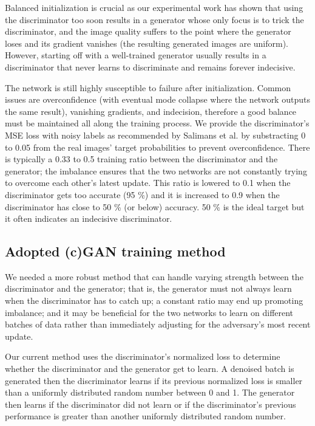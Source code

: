Balanced initialization is crucial as our experimental work has shown that using the discriminator too soon results in a generator whose only focus is to trick the discriminator, and the image quality suffers to the point where the generator loses and its gradient vanishes (the resulting generated images are uniform). However, starting off with a well-trained generator usually results in a discriminator that never learns to discriminate and remains forever indecisive.

The network is still highly susceptible to failure after initialization. Common issues are overconfidence (with eventual mode collapse where the network outputs the same result), vanishing gradients, and indecision, therefore a good balance must be maintained all along the training process. We provide the discriminator's \ac{MSE} loss with noisy labels as recommended by Salimans et al. \cite{gantechniques}\cite{gantutorial} by substracting 0 to 0.05 from the real images' target probabilities to prevent overconfidence. There is typically a 0.33 to 0.5 training ratio between the discriminator and the generator; the imbalance ensures that the two networks are not constantly trying to overcome each other's latest update. This ratio is lowered to 0.1 when the discriminator gets too accurate (95 \%) and it is increased to 0.9 when the discriminator has close to 50 \% (or below) accuracy. 50 \% is the ideal target but it often indicates an indecisive discriminator.

\subsection{Adopted (c)GAN training method}\label{sec:Adopted training method}

We needed a more robust method that can handle varying strength between the discriminator and the generator; that is, the generator must not always learn when the discriminator has to catch up; a constant ratio may end up promoting imbalance; and it may be beneficial for the two networks to learn on different batches of data rather than immediately adjusting for the adversary's most recent update.

Our current method uses the discriminator's normalized loss to determine whether the discriminator and the generator get to learn. A denoised batch is generated then the discriminator learns if its previous normalized loss is smaller than a uniformly distributed random number between 0 and 1. The generator then learns if the discriminator did not learn or if the discriminator's previous performance is greater than another uniformly distributed random number.

